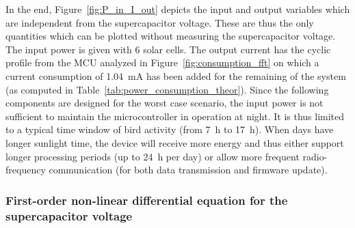 \documentclass{EPL-master-thesis-covers-EN}
\begin{document}
In the end, Figure~\ref{fig:P_in_I_out} depicts the input and output variables which are independent from the supercapacitor voltage. These are thus the only quantities which can be plotted without measuring the supercapacitor voltage. The input power is given with 6 solar cells. The output current has the cyclic profile from the MCU analyzed in Figure~\ref{fig:consumption_fft} on which a current consumption of \SI{1.04}{mA} has been added for the remaining of the system (as computed in Table~\ref{tab:power_consumption_theor}). Since the following components are designed for the worst case scenario, the input power is not sufficient to maintain the microcontroller in operation at night. It is thus limited to a typical time window of bird activity (from \SI{7}{h} to \SI{17}{h}). When days have longer sunlight time, the device will receive more energy and thus either support longer processing periods (up to \SI{24}{h} per day) or allow more frequent radio-frequency communication (for both data transmission and firmware update).

\subsubsection*{First-order non-linear differential equation for the supercapacitor voltage}
\end{document}
